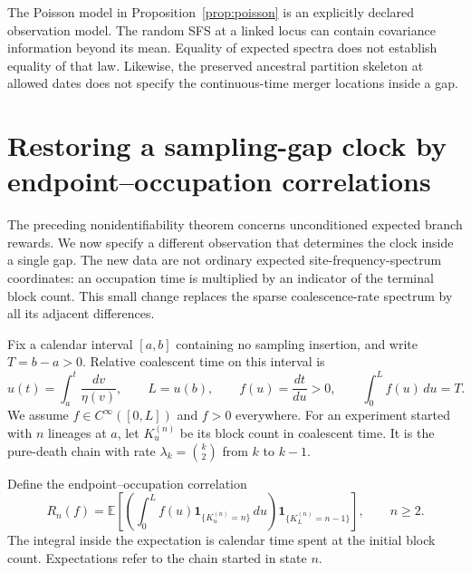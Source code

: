 \documentclass[11pt]{article}
\theoremstyle{definition}
\theoremstyle{remark}
\numberwithin{equation}{section}
\begin{document}
The Poisson model in Proposition~\ref{prop:poisson} is an explicitly
declared observation model. The random SFS at a linked locus can contain
covariance information beyond its mean. Equality of expected spectra
does not establish equality of that law. Likewise, the preserved
ancestral partition skeleton at allowed dates does not specify the
continuous-time merger locations inside a gap.



\section{Restoring a sampling-gap clock by endpoint--occupation correlations}
\label{restore:section}

The preceding nonidentifiability theorem concerns unconditioned expected
branch rewards.  We now specify a different observation that determines
the clock inside a single gap.  The new data are not ordinary expected
site-frequency-spectrum coordinates: an occupation time is multiplied by
an indicator of the terminal block count.  This small change replaces the
sparse coalescence-rate spectrum by all its adjacent differences.

Fix a calendar interval $[a,b]$ containing no sampling insertion, and write
$T=b-a>0$.  Relative coalescent time on this interval is
\[
 u(t)=\int_a^t\frac{dv}{\eta(v)},\qquad L=u(b),
 \qquad f(u)=\frac{dt}{du}>0,\qquad \int_0^L f(u)\,du=T.
\]
We assume $f\in C^\infty([0,L])$ and $f>0$ everywhere.  For an experiment
started with $n$ lineages at $a$, let $K^{(n)}_u$ be its block count in
coalescent time.  It is the pure-death chain with rate
$\lambda_k=\binom{k}{2}$ from $k$ to $k-1$.

Define the endpoint--occupation correlation
\begin{equation}\label{restore:Rdef}
 R_n(f)=\mathbb E\left[
     \left(\int_0^L f(u)\mathbf 1_{\{K^{(n)}_u=n\}}\,du\right)
                  \mathbf 1_{\{K^{(n)}_L=n-1\}}\right],\qquad n\ge2.
\end{equation}
The integral inside the expectation is calendar time spent at the initial
block count.  Expectations refer to the chain started in state $n$.
\end{document}
